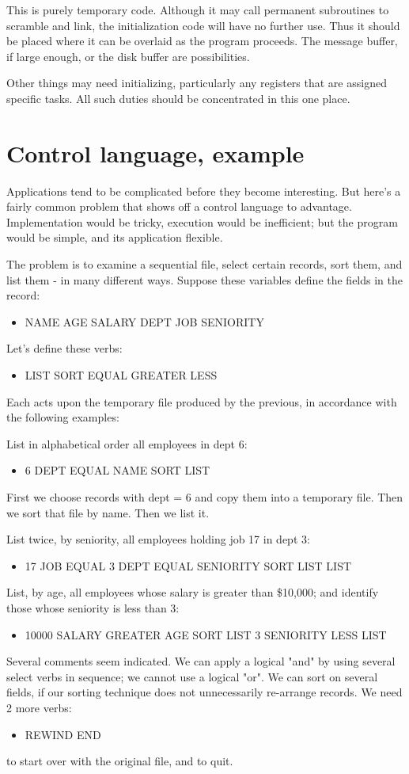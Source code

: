 \documentclass[b5paper, oneside]{book}
\begin{document}
This is purely temporary code. Although it may call permanent subroutines to scramble and link, the initialization code will have no further use. Thus it should be placed where it can be overlaid as the program proceeds. The message buffer, if large enough, or the disk buffer are possibilities.

Other things may need initializing, particularly any registers that are assigned specific tasks. All such duties should be concentrated in this one place.

\section{Control language, example}
Applications tend to be complicated before they become interesting. But here's a fairly common problem that shows off a control language to advantage. Implementation would be tricky, execution would be inefficient; but the program would be simple, and its application flexible.

The problem is to examine a sequential file, select certain records, sort them, and list them - in many different ways. Suppose these variables define the fields in the record:\begin{itemize}
   \item NAME AGE SALARY DEPT JOB SENIORITY\end{itemize}
Let's define these verbs:\begin{itemize}
   \item LIST SORT EQUAL GREATER LESS\end{itemize}
Each acts upon the temporary file produced by the previous, in accordance with the following examples:

List in alphabetical order all employees in dept 6:\begin{itemize}
   \item 6 DEPT EQUAL NAME SORT LIST\end{itemize}
First we choose records with dept = 6 and copy them into a temporary file. Then we sort that file by name. Then we list it.

List twice, by seniority, all employees holding job 17 in dept 3:\begin{itemize}
   \item 17 JOB EQUAL 3 DEPT EQUAL SENIORITY SORT LIST LIST\end{itemize}
List, by age, all employees whose salary is greater than \$10,000; and identify those whose seniority is less than 3:\begin{itemize}
   \item 10000 SALARY GREATER AGE SORT LIST 3 SENIORITY LESS LIST\end{itemize}
Several comments seem indicated. We can apply a logical "and" by using several select verbs in sequence; we cannot use a logical "or". We can sort on several fields, if our sorting technique does not unnecessarily re-arrange records. We need 2 more verbs:\begin{itemize}
   \item REWIND END\end{itemize}
to start over with the original file, and to quit.
\end{document}
